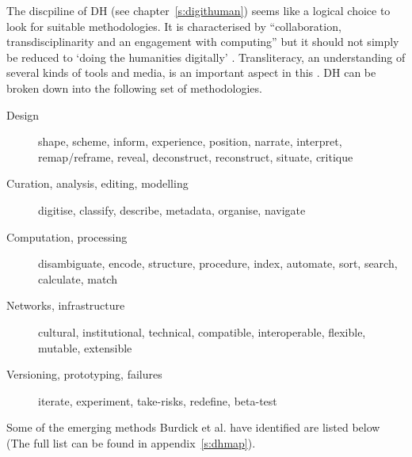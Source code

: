 The discpiline of \ac{DH} (see chapter~\ref{s:digithuman}) seems like a logical choice to look for suitable methodologies. It is characterised by ``collaboration, transdisciplinarity and an engagement with computing'' \autocite{Burdick2012} but it should not simply be reduced to `doing the humanities digitally' \autocite{Burdick2012}. Transliteracy, an understanding of several kinds of tools and media, is an important aspect in this \autocite{Thomas2007}. \ac{DH} can be broken down into the following set of methodologies.

\begin{description}
  \item [Design] shape, scheme, inform, experience, position, narrate,
  					interpret, remap/reframe, reveal, deconstruct, reconstruct,
  					situate, critique
  \item [Curation, analysis, editing, modelling] digitise, classify, describe, metadata, organise, navigate
  \item [Computation, processing] disambiguate, encode, structure, procedure, index, automate, sort, search, calculate, match
  \item [Networks, infrastructure] cultural, institutional, technical, compatible, interoperable, flexible, mutable, extensible
  \item [Versioning, prototyping, failures]	iterate, experiment, take-risks, redefine, beta-test
\end{description}

Some of the emerging methods Burdick et al. have identified are listed below \autocite*{Burdick2012} (The full list can be found in appendix~\ref{s:dhmap}).

